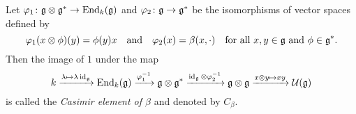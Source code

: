 \begin{defi}\label{defi: definition of Casimir element}
 Let $\varphi_1 \colon \mathfrak{g} \otimes \mathfrak{g}^* \to \operatorname{End}_k(\mathfrak{g})$ and $\varphi_2 \colon \mathfrak{g} \to \mathfrak{g}^*$ be the isomorphisms of vector spaces defined by
 \[
  \varphi_1(x \otimes \phi)(y) = \phi(y) x
  \quad\text{and}\quad
  \varphi_2(x) = \beta(x, \cdot)
  \quad\text{for all $x,y \in \mathfrak{g}$ and $\phi \in \mathfrak{g}^*$}.
 \]
 Then the image of $1$ under the map
 \begin{equation}\label{eqn: Casimir without coordinates}
  k
  \xrightarrow{\lambda \mapsto \lambda \operatorname{id}_{\mathfrak{g}}}
  \operatorname{End}_k(\mathfrak{g})
  \xrightarrow{\varphi_1^{-1}}
  \mathfrak{g} \otimes \mathfrak{g}^*
  \xrightarrow{\operatorname{id}_{\mathfrak{g}} \otimes \varphi_2^{-1}}
  \mathfrak{g} \otimes \mathfrak{g}
  \xrightarrow{x \otimes y \mapsto x y}
  \mathcal{U}(\mathfrak{g})
 \end{equation}
 is called the \emph{Casimir element of $\beta$} and denoted by $C_\beta$.
\end{defi}


